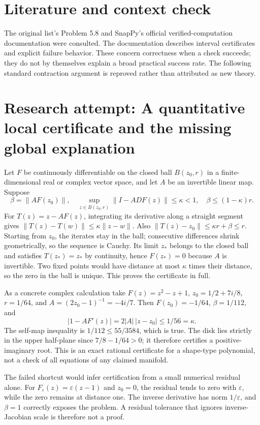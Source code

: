 \documentclass[11pt]{article}
\begin{document}
\section{Literature and context check}
The original list's Problem 5.8 and SnapPy's official verified-computation
documentation were consulted. The documentation describes interval certificates
and explicit failure behavior. These concern correctness when a check succeeds;
they do not by themselves explain a broad practical success rate. The following
standard contraction argument is reproved rather than attributed as new theory.
\section{Research attempt: A quantitative local certificate and the missing global explanation}
Let $F$ be continuously differentiable on the closed ball $B(z_0,r)$ in a
finite-dimensional real or complex vector space, and let $A$ be an invertible
linear map. Suppose
\[
 \beta=\|AF(z_0)\|,\quad
 \sup_{z\in B(z_0,r)}\|I-ADF(z)\|\le\kappa<1,
 \quad \beta\le(1-\kappa)r.
\]
For $T(z)=z-AF(z)$, integrating its derivative along a straight segment gives
$\|T(z)-T(w)\|\le\kappa\|z-w\|$. Also
$\|T(z)-z_0\|\le\kappa r+\beta\le r$. Starting from $z_0$, the iterates stay
in the ball; consecutive differences shrink geometrically, so the sequence
is Cauchy. Its limit $z_*$ belongs to the closed ball and satisfies
$T(z_*)=z_*$ by continuity, hence $F(z_*)=0$ because $A$ is invertible.
Two fixed points would have distance at most $\kappa$ times their distance,
so the zero in the ball is unique. This proves the certificate in full.

As a concrete complex calculation take $F(z)=z^2-z+1$,
$z_0=1/2+7i/8$, $r=1/64$, and $A=(2z_0-1)^{-1}=-4i/7$.
Then $F(z_0)=-1/64$, $\beta=1/112$, and
\[
 |1-AF'(z)|=2|A|\,|z-z_0|\le1/56=\kappa.
\]
The self-map inequality is $1/112\le55/3584$, which is true. The disk lies
strictly in the upper half-plane since $7/8-1/64>0$; it therefore certifies a
positive-imaginary root. This is an exact rational certificate for a shape-type
polynomial, not a check of all equations of any claimed manifold.

The failed shortcut would infer certification from a small numerical residual
alone. For $F_\varepsilon(z)=\varepsilon(z-1)$ and $z_0=0$, the residual tends
to zero with $\varepsilon$, while the zero remains at distance one. The inverse
derivative has norm $1/\varepsilon$, and $\beta=1$ correctly exposes the
problem. A residual tolerance that ignores inverse-Jacobian scale is therefore
not a proof.
\end{document}
